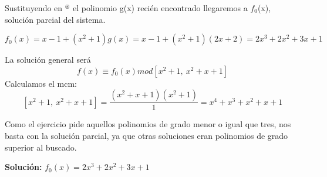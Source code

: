 \documentclass[11pt, a4paper, titlepage]{article}
\begin{document}
Sustituyendo en $^\circledast$ el polinomio g(x) recién encontrado llegaremos a $f_0$(x), solución parcial del sistema. 

$$f_0(x) = x-1 + (x^2+1)g(x) = x-1 + (x^2+1)(2x+2) = 2x^3+2x^2+3x+1$$

La solución general será $$f(x) \equiv f_0(x) mod[x^2+1,\ x^2+x+1]$$
Calculamos el mcm:
\[
	[x^2+1,\ x^2+x+1] = \frac{(x^2+x+1)(x^2+1)}{1} =x^4+x^3+x^2+x+1
\]

Como el ejercicio pide aquellos polinomios de grado menor o igual que tres, nos basta con la solución parcial, ya que otras soluciones eran polinomios de grado superior al buscado.

\textbf{Solución:} $f_0(x) = 2x^3+2x^2+3x+1$
\end{document}
